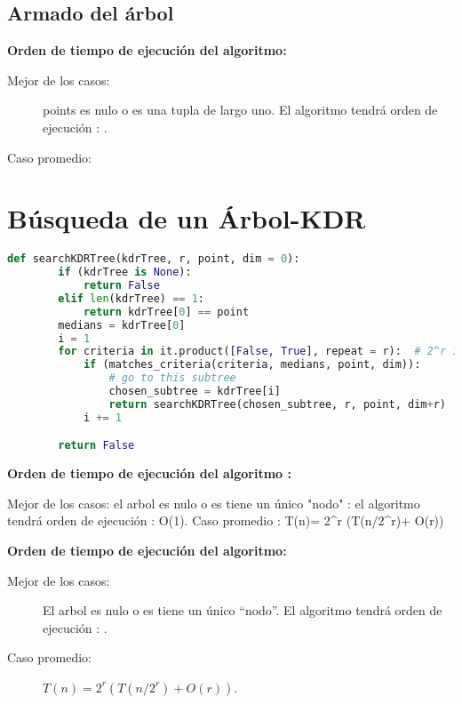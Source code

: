 \subsection{Armado del árbol}



\textbf{Orden de tiempo de ejecución del algoritmo:}
\begin{description}
\item[Mejor de los casos:] points es nulo o es una tupla de largo uno.
  El algoritmo tendrá orden de ejecución : .
\item[Caso promedio:] 
\end{description}



	\section{Búsqueda de un Árbol-KDR}
	\begin{lstlisting}[language=Python]
	def searchKDRTree(kdrTree, r, point, dim = 0):
		if (kdrTree is None):
			return False
		elif len(kdrTree) == 1:
			return kdrTree[0] == point
		medians = kdrTree[0]
		i = 1
		for criteria in it.product([False, True], repeat = r):  # 2^r iteraciones
			if (matches_criteria(criteria, medians, point, dim)):
				# go to this subtree
				chosen_subtree = kdrTree[i]
				return searchKDRTree(chosen_subtree, r, point, dim+r)
			i += 1

		return False
		\end{lstlisting}
	\textbf{ Orden de tiempo de ejecución del algoritmo : }
		{Mejor de los casos: el arbol es nulo o es tiene un único "nodo" :
		el algoritmo tendrá orden de ejecución : O(1).
		Caso promedio : T(n)= 2^r (T(n/2^r)+ O(r))



		}



\textbf{Orden de tiempo de ejecución del algoritmo:}
\begin{description}
\item[Mejor de los casos:] El arbol es nulo o es tiene un único ``nodo''.
  El algoritmo tendrá orden de ejecución : .
\item[Caso promedio:] \(T(n)= 2^r (T(n/2^r)+ O(r))\).
\end{description}

